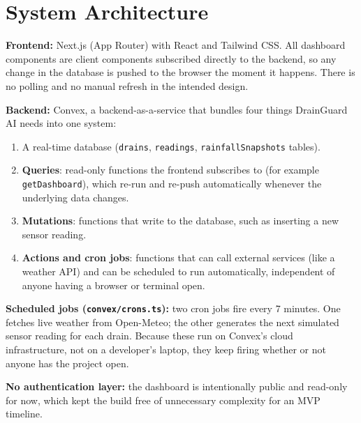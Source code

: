 \documentclass[11pt]{article}
\begin{document}
\section{System Architecture}
\textbf{Frontend:} Next.js (App Router) with React and Tailwind CSS. All dashboard components are client components subscribed directly to the backend, so any change in the database is pushed to the browser the moment it happens. There is no polling and no manual refresh in the intended design.

\textbf{Backend:} Convex, a backend-as-a-service that bundles four things DrainGuard AI needs into one system:
\begin{enumerate}
  \item A real-time database (\texttt{drains}, \texttt{readings}, \texttt{rainfallSnapshots} tables).
  \item \textbf{Queries}: read-only functions the frontend subscribes to (for example \texttt{getDashboard}), which re-run and re-push automatically whenever the underlying data changes.
  \item \textbf{Mutations}: functions that write to the database, such as inserting a new sensor reading.
  \item \textbf{Actions and cron jobs}: functions that can call external services (like a weather API) and can be scheduled to run automatically, independent of anyone having a browser or terminal open.
\end{enumerate}

\textbf{Scheduled jobs (\texttt{convex/crons.ts}):} two cron jobs fire every 7 minutes. One fetches live weather from Open-Meteo; the other generates the next simulated sensor reading for each drain. Because these run on Convex's cloud infrastructure, not on a developer's laptop, they keep firing whether or not anyone has the project open.

\textbf{No authentication layer:} the dashboard is intentionally public and read-only for now, which kept the build free of unnecessary complexity for an MVP timeline.
\end{document}
